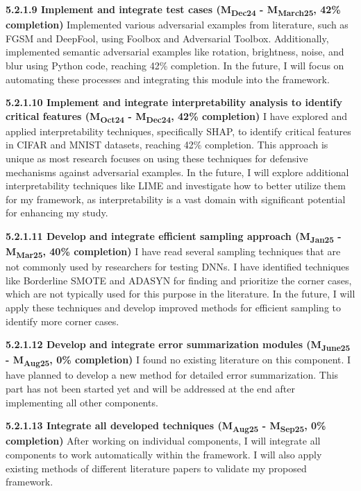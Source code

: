 \noindent \textbf{5.2.1.9 Implement and integrate test cases (M\textsubscript{Dec24} - M\textsubscript{March25}, 42\% completion)} Implemented various adversarial examples from literature, such as FGSM and DeepFool, using Foolbox and Adversarial Toolbox. Additionally, implemented semantic adversarial examples like rotation, brightness, noise, and blur using Python code, reaching 42\% completion. In the future, I will focus on automating these processes and integrating this module into the framework.

\noindent \textbf{5.2.1.10 Implement and integrate interpretability analysis to identify critical features (M\textsubscript{Oct24} - M\textsubscript{Dec24}, 42\% completion)} I have explored and applied interpretability techniques, specifically SHAP, to identify critical features in CIFAR and MNIST datasets, reaching 42\% completion. This approach is unique as most research focuses on using these techniques for defensive mechanisms against adversarial examples. In the future, I will explore additional interpretability techniques like LIME and investigate how to better utilize them for my framework, as interpretability is a vast domain with significant potential for enhancing my study.

\noindent \textbf{5.2.1.11 Develop and integrate efficient sampling approach (M\textsubscript{Jan25} - M\textsubscript{Mar25}, 40\% completion)} I have read several sampling techniques that are not commonly used by researchers for testing DNNs. I have identified techniques like Borderline SMOTE and ADASYN for finding and prioritize the corner cases, which are not typically used for this purpose in the literature. In the future, I will apply these techniques and develop improved methods for efficient sampling to identify more corner cases.

\noindent \textbf{5.2.1.12 Develop and integrate error summarization modules (M\textsubscript{June25} - M\textsubscript{Aug25}, 0\% completion)} I found no existing literature on this component. I have planned to develop a new method for detailed error summarization. This part has not been started yet and will be addressed at the end after implementing all other components.

\noindent \textbf{5.2.1.13 Integrate all developed techniques (M\textsubscript{Aug25} - M\textsubscript{Sep25}, 0\% completion)} After working on individual components, I will integrate all components to work automatically within the framework. I will also apply existing methods of different literature papers to validate my proposed framework.


